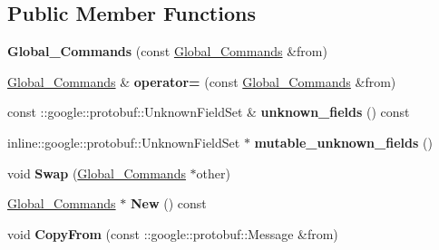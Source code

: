 \subsection*{Public Member Functions}
\begin{DoxyCompactItemize}
\item 
{\bfseries Global\+\_\+\+Commands} (const \hyperlink{classvss__command_1_1Global__Commands}{Global\+\_\+\+Commands} \&from)\hypertarget{classvss__command_1_1Global__Commands_ac5a1e52df1880363fccb681c303ec821}{}\label{classvss__command_1_1Global__Commands_ac5a1e52df1880363fccb681c303ec821}

\item 
\hyperlink{classvss__command_1_1Global__Commands}{Global\+\_\+\+Commands} \& {\bfseries operator=} (const \hyperlink{classvss__command_1_1Global__Commands}{Global\+\_\+\+Commands} \&from)\hypertarget{classvss__command_1_1Global__Commands_a1e2590dfc4b0e2c8c20a8f5c68531a22}{}\label{classvss__command_1_1Global__Commands_a1e2590dfc4b0e2c8c20a8f5c68531a22}

\item 
const \+::google\+::protobuf\+::\+Unknown\+Field\+Set \& {\bfseries unknown\+\_\+fields} () const \hypertarget{classvss__command_1_1Global__Commands_aadc4690c81ad4df3443b087428e1de73}{}\label{classvss__command_1_1Global__Commands_aadc4690c81ad4df3443b087428e1de73}

\item 
inline\+::google\+::protobuf\+::\+Unknown\+Field\+Set $\ast$ {\bfseries mutable\+\_\+unknown\+\_\+fields} ()\hypertarget{classvss__command_1_1Global__Commands_a1882397164e8072272d76b8172991013}{}\label{classvss__command_1_1Global__Commands_a1882397164e8072272d76b8172991013}

\item 
void {\bfseries Swap} (\hyperlink{classvss__command_1_1Global__Commands}{Global\+\_\+\+Commands} $\ast$other)\hypertarget{classvss__command_1_1Global__Commands_a1bf67bb767a2b899fceb94bf88a52ba7}{}\label{classvss__command_1_1Global__Commands_a1bf67bb767a2b899fceb94bf88a52ba7}

\item 
\hyperlink{classvss__command_1_1Global__Commands}{Global\+\_\+\+Commands} $\ast$ {\bfseries New} () const \hypertarget{classvss__command_1_1Global__Commands_a6d4aeb9a55672fcfa0876e62de431a05}{}\label{classvss__command_1_1Global__Commands_a6d4aeb9a55672fcfa0876e62de431a05}

\item 
void {\bfseries Copy\+From} (const \+::google\+::protobuf\+::\+Message \&from)\hypertarget{classvss__command_1_1Global__Commands_a4bd5bb12d6e5f08346704aa04a30fe57}{}\label{classvss__command_1_1Global__Commands_a4bd5bb12d6e5f08346704aa04a30fe57}


\end{DoxyCompactItemize}
